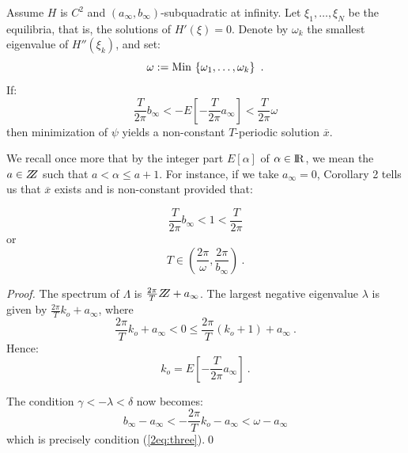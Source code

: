 \documentclass{llncs}
\begin{document}
%
\begin{corollary}
Assume $H$ is $C^{2}$ and
$\left(a_{\infty},b_{\infty}\right)$-subquadratic at infinity. Let
$\xi_{1},\allowbreak\dots,\allowbreak\xi_{N}$  be the
equilibria, that is, the solutions of $H' (\xi ) = 0$.
Denote by $\omega_{k}$
the smallest eigenvalue of $H'' \left(\xi_{k}\right)$, and set:
\begin{equation}
  \omega : = {\rm Min\,} \left\{\omega_{1},\dots,\omega_{k}\right\}\ .
\end{equation}
If:
\begin{equation}
  \frac{T}{2\pi} b_{\infty} <
  - E \left[- \frac{T}{2\pi}a_{\infty}\right] <
  \frac{T}{2\pi}\omega
  \label{2eq:three}
\end{equation}
then minimization of $\psi$ yields a non-constant $T$-periodic solution
$\overline{x}$.
\end{corollary}
%

We recall once more that by the integer part $E [\alpha ]$ of
$\alpha \in {\rm I\!R}$, we mean the $a\in \bbbz$
such that $a< \alpha \le a+1$. For instance,
if we take $a_{\infty} = 0$, Corollary 2 tells
us that $\overline{x}$ exists and is
non-constant provided that:

\begin{equation}
  \frac{T}{2\pi} b_{\infty} < 1 < \frac{T}{2\pi}
\end{equation}
or
\begin{equation}
  T\in \left(\frac{2\pi}{\omega},\frac{2\pi}{b_{\infty}}\right)\ .
  \label{2eq:four}
\end{equation}

%
\begin{proof}
The spectrum of $\Lambda$ is $\frac{2\pi}{T} \bbbz +a_{\infty}$. The
largest negative eigenvalue $\lambda$ is given by
$\frac{2\pi}{T}k_{o} +a_{\infty}$,
where
\begin{equation}
  \frac{2\pi}{T}k_{o} + a_{\infty} < 0
  \le \frac{2\pi}{T} (k_{o} +1) + a_{\infty}\ .
\end{equation}
Hence:
\begin{equation}
  k_{o} = E \left[- \frac{T}{2\pi} a_{\infty}\right] \ .
\end{equation}

The condition $\gamma < -\lambda < \delta$ now becomes:
\begin{equation}
  b_{\infty} - a_{\infty} <
  - \frac{2\pi}{T} k_{o} -a_{\infty} < \omega -a_{\infty}
\end{equation}
which is precisely condition (\ref{2eq:three}).\qed
\end{proof}
%
\end{document}
